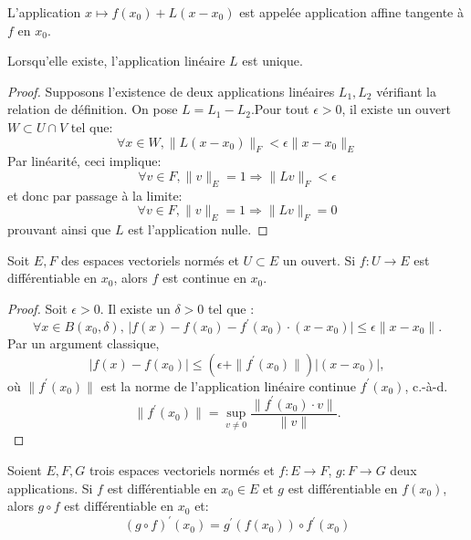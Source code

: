 L'application $ x \mapsto f(x_0) + L(x-x_0)$ est appelée application affine tangente à $f$ en $x_0$.
\begin{prop}
Lorsqu'elle existe, l'application linéaire $L$ est unique.
\end{prop}
\begin{proof}
Supposons l'existence de deux applications linéaires  $L_1, L_2$ vérifiant la relation de définition. On pose $L =  L_1 - L_2$.Pour tout $\epsilon > 0$, il existe un ouvert $W \subset U \cap V$ tel que:
\[
\forall x \in W, \|L(x-x_0)\|_F < \epsilon \| x-x_0 \|_E
\]
Par linéarité, ceci implique:
\[
\forall v \in F, \|v\|_E = 1 \Rightarrow \|L v \|_F < \epsilon 
\]
et donc par passage à la limite:
\[
\forall v \in F, \|v\|_E = 1 \Rightarrow \|L v \|_F = 0
\]
prouvant ainsi que $L$ est l'application nulle.
\end{proof}
\begin{fprop}\label{prop:1.1}
  Soit $E,F$ des espaces vectoriels normés et $U \subset E$ un ouvert. 
Si $f \colon U \to E$ est différentiable en $x_0$, alors $f$ est continue en $x_0$.
\end{fprop}
\begin{proof}
Soit $\epsilon > 0$. Il existe un $\delta >0$ tel que :
\[ \forall x \in B(x_0,\delta), \, \lvert f(x) - f(x_0) -f^\prime(x_0)\cdot(x-x_0) \rvert \leq \epsilon \|x-x_0\|.\]
Par un argument classique,
\[\lvert f(x) -f(x_0)\rvert \leq \left(\epsilon + \|f^\prime(x_0)\| \right)\lvert (x-x_0) \rvert,\]
où $\|f^\prime(x_0)\|$ est la norme de l'application linéaire continue $f^\prime(x_0)$, c.-à-d. 
\[ \|f^\prime(x_0)\| = \sup_{v \neq 0} \frac{\|f^\prime(x_0) \cdot v\|}{\|v\|}.\]
\end{proof}
\begin{fprop}
  \label{prop:der_compo}
Soient $E,F,G$ trois espaces vectoriels normés et $f \colon E \to F$, $g \colon F \to G$ deux applications. Si $f$ est différentiable en $x_0 \in E$ et $g$ 
est différentiable en $f(x_0)$, alors $g \circ f$ est différentiable en $x_0$ et:
\begin{equation}
  \left( g \circ f \right)^\prime(x_0) = g^\prime\left( f(x_0) \right) \circ f^\prime(x_0)
\end{equation} 
\end{fprop}
